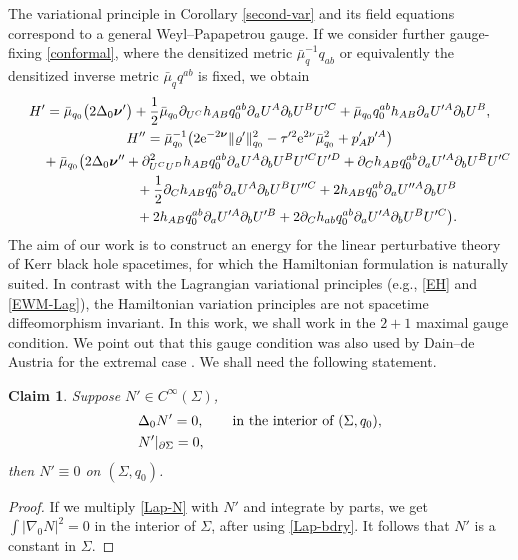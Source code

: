 \documentclass[11pt]{article}
\numberwithin{equation}{section}
\def\ptl{\partial}%
\def\mbo#1{\boldsymbol{#1}}%
\def\grad{{\nabla}}%
\def\halb{\frac{1}{2}}%
\numberwithin{equation}{section}
\newtheorem{claim}[Theorem]{Claim}
 { \theoremstyle{definition}
\newtheorem{Definition}[Theorem]{Definition}
\newtheorem{Note}[Theorem]{Note}
\newtheorem{Example}[Theorem]{Example}
\newtheorem{Remark}[Theorem]{Remark} }
\begin{document}
The variational principle in Corollary \ref{second-var} and its field equations correspond to a general Weyl--Papapetrou gauge. If we consider further gauge-fixing \eqref{conformal}, where the densitized metric $ \bar{\mu}^{-1}_q q_{ab}$ or equivalently the densitized inverse metric $\bar{\mu}_q q^{ab}$ is fixed, we obtain
\begin{gather*}
H' = \bar{\mu}_{q_0} \bigl(2 \Delta_0 \mbo{\nu}'\bigr) + \halb \bar{\mu}_{q_0} \ptl_{U^C} h_{AB} q_0^{ab} \ptl_a U^A \ptl_b U^B U'^C
+ \bar{\mu}_{q_0} q_0^{ab} h_{AB} \ptl_a U'^A \ptl_b U^B, \notag\\
H'' =\bar{\mu}^{-1}_{q_0} \bigl(2 {\rm e}^{-2\mbo{\nu}} \Vert \varrho' \Vert^2_{q_0} - \tau'^2 {\rm e}^{2\nu} \bar{\mu}^2_{q_0} + p'_A p'^A\bigr)\notag \\
\hphantom{H'' =}{}
+ \bar{\mu}_{q_0} \bigl(2 \Delta_0 \mbo{\nu}'' + \ptl^2_{U^C U^D} h_{AB} q^{ab}_0 \ptl_a U^A \ptl_b U^B U'^C U'^D + \ptl_C h_{AB} q^{ab}_0 \ptl_a U'^A \ptl_b U^B U'^C \notag\\
\hphantom{H'' =+ \bar{\mu}_{q_0} \bigl(}{}
+ \halb \ptl_Ch_{AB} q_{0}^{ab} \ptl_a U^A \ptl_b U^B U''^C + 2 h_{AB} q^{ab}_{0} \ptl_a U''^A \ptl_b U^B \notag\\
\hphantom{H'' =+ \bar{\mu}_{q_0} \bigl(}{}
+ 2h_{AB} q^{ab}_0 \ptl_a U'^A \ptl_bU'^B + 2 \ptl_C h_{ab} q^{ab}_0 \ptl_a U'^A \ptl_b U^B U'^C \bigr).
\end{gather*}
The aim of our work is to construct an energy for the linear perturbative theory of Kerr black hole spacetimes, for which the Hamiltonian formulation is naturally suited. In contrast with the Lagrangian variational principles (e.g., \eqref{EH} and \eqref{EWM-Lag}), the Hamiltonian variation principles are not spacetime diffeomorphism invariant.
In this work, we shall work in the $2 + 1$ maximal gauge condition. We point out that this gauge condition was also used by Dain--de Austria for the extremal case \cite{DA_14}. We shall need the following statement.

\begin{claim} \label{2+1max}
Suppose $N' \in C^{\infty} (\Sigma)$,
\begin{subequations}
\begin{align}
&\Delta_0 N' = 0, \qquad \textnormal{in the interior of $(\Sigma, q_0 )$}, \label{Lap-N}\\
&N' \vert_{\ptl \Sigma}= 0, \label{Lap-bdry}
\end{align}
\end{subequations}
 then $ N' \equiv 0$ on $(\Sigma, q_0)$.
\end{claim}
\begin{proof}
If we multiply \eqref{Lap-N} with $N'$ and integrate by parts, we get $\int \vert \grad_0 N \vert^2 =0$ in the interior of $\Sigma$, after using \eqref{Lap-bdry}. It follows that $N'$ is a constant in $\Sigma$.
\end{proof}
\end{document}
